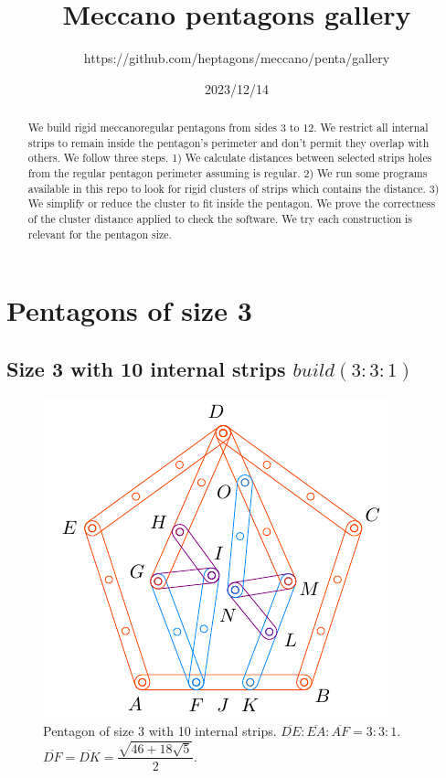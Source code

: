 \documentclass[11pt]{article}
\title{Meccano pentagons gallery}
\author{https://github.com/heptagons/meccano/penta/gallery}
\date{2023/12/14}
\begin{document}
\maketitle
\begin{abstract}
We build rigid meccano\meccanoref regular pentagons from sides $3$ to $12$. We restrict all internal strips to remain inside the pentagon's perimeter and don't permit they overlap with others. We follow three steps. 1) We calculate distances between selected strips holes from the regular pentagon perimeter assuming is regular. 2) We run some programs available in this repo to look for rigid clusters of strips which contains the distance. 3) We simplify or reduce the cluster to fit inside the pentagon. We prove the correctness of the cluster distance applied to check the software. We try each construction is relevant for the pentagon size.
\end{abstract}


\section{Pentagons of size 3}

\subsection{Size 3 with 10 internal strips $build(3:3:1)$}

\begin{figure}[H]
\centering
\includegraphics[scale=1.2]{3/penta3-10a}
\caption{Pentagon of size 3 with 10 internal strips. $\overline{DE}:\overline{EA}:\overline{AF} = 3:3:1$. $\overline{DF} = \overline{DK} = \dfrac{\sqrt{46+18\sqrt5}}2$.}
\label{fig:penta3-10a}
\end{figure}
\end{document}
